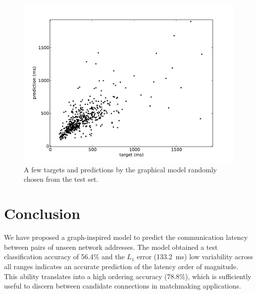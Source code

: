 \documentclass[10pt,a4paper,notitlepage,twocolumn]{article}
\begin{document}



\begin{figure}[h]
\centering
\includegraphics[width=\columnwidth]{full_scatter}
\caption{A few targets and predictions by the graphical model randomly chosen from the test set.}
\label{fig:samples}
\end{figure}


\section{Conclusion}

We have proposed a graph-inspired model to predict the communication latency between pairs of unseen network addresses.
The model obtained a test classification accuracy of 56.4\% and the $L_1$ error (133.2~ms) low variability across all ranges indicates an accurate prediction of the latency order of magnitude.
This ability translates into a high ordering accuracy (78.8\%), which is sufficiently useful to discern between candidate connections in matchmaking applications.
\end{document}
